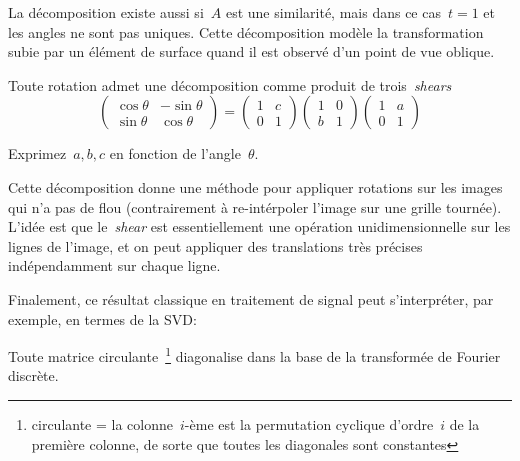 La décomposition existe aussi si~$A$ est une similarité, mais dans ce
cas~$t=1$ et les angles ne sont pas uniques.
Cette décomposition modèle la transformation subie par un élément de surface
quand il est observé d'un point de vue oblique.



\bigskip

\begin{proposition}
	Toute rotation admet une décomposition comme produit de trois~\emph{shears}
	\[
		\begin{pmatrix}\cos\theta & -\sin\theta\\\sin\theta & \cos\theta\end{pmatrix}
		=
		\begin{pmatrix}1&c\\0&1\end{pmatrix}
		\begin{pmatrix}1&0\\b&1\end{pmatrix}
		\begin{pmatrix}1&a\\0&1\end{pmatrix}
	\]
\end{proposition}

\begin{exercice}
	Exprimez~$a,b,c$ en fonction de l'angle~$\theta$.
\end{exercice}

Cette décomposition donne une méthode pour appliquer rotations sur les images
qui n'a pas de flou (contrairement à re-intérpoler l'image sur une grille
tournée).  L'idée est que le~\emph{shear} est essentiellement une opération
unidimensionnelle sur les lignes de l'image, et on peut appliquer des
translations très précises indépendamment sur chaque ligne.

\bigskip

Finalement, ce résultat classique en traitement de signal peut s'interpréter,
par exemple, en termes de la SVD:

\begin{proposition}
	Toute matrice circulante~\footnote{circulante = la colonne~$i$-ème est la
	permutation cyclique d'ordre~$i$ de la première colonne, de sorte que
toutes les diagonales sont constantes} diagonalise dans la base de la
transformée de Fourier discrète.
\end{proposition}

